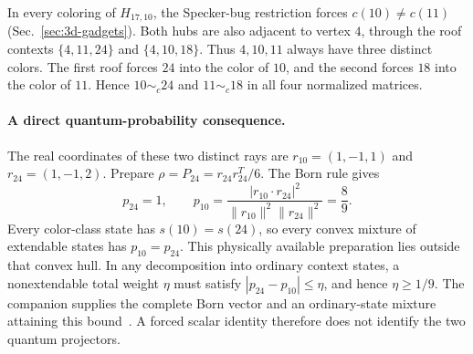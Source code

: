 \documentclass[aps,pra,reprint,superscriptaddress,longbibliography,nofootinbib,floatfix,10pt]{revtex4-2}
\theoremstyle{definition}\newtheorem{definition}[theorem]{Definition}
\theoremstyle{remark}\newtheorem{remark}[theorem]{Remark}
\begin{document}
In every coloring of $H_{17,10}$, the Specker-bug restriction forces $c(10)\ne c(11)$ (Sec.~\ref{sec:3d-gadgets}). Both hubs are also adjacent to vertex $4$, through the roof contexts $\{4,11,24\}$ and $\{4,10,18\}$. Thus $4,10,11$ always have three distinct colors. The first roof forces $24$ into the color of $10$, and the second forces $18$ into the color of $11$. Hence $10\sim_c24$ and $11\sim_c18$ in all four normalized matrices.


\paragraph{A direct quantum-probability consequence.}
The real coordinates of these two distinct rays are $r_{10}=(1,-1,1)$ and $r_{24}=(1,-1,2)$. Prepare $\rho=P_{24}=r_{24}r_{24}^{T}/6$. The Born rule gives
\begin{equation}\label{eq:H17-physical-born}
p_{24}=1,\qquad p_{10}=\frac{|r_{10}\cdot r_{24}|^2}{\|r_{10}\|^2\|r_{24}\|^2}=\frac89.
\end{equation}
Every color-class state has $s(10)=s(24)$, so every convex mixture of extendable states has $p_{10}=p_{24}$. This physically available preparation lies outside that convex hull. In any decomposition into ordinary context states, a nonextendable total weight $\eta$ must satisfy $|p_{24}-p_{10}|\le\eta$, and hence $\eta\ge1/9$. The companion supplies the complete Born vector and an ordinary-state mixture attaining this bound~\cite{svozil2026contexts,supplement}. A forced scalar identity therefore does not identify the two quantum projectors.
\end{document}
